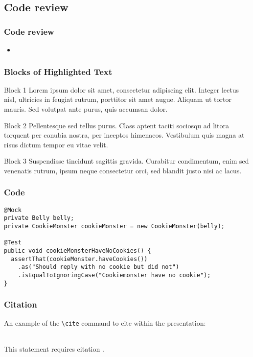 \documentclass{beamer}
\begin{document}
  \subsection{Code review}
    \begin{frame}
    \frametitle{Code review}
    \begin{itemize}
    \item
    \end{itemize}
    \end{frame}

\begin{frame}
\frametitle{Blocks of Highlighted Text}
\begin{block}{Block 1}
Lorem ipsum dolor sit amet, consectetur adipiscing elit. Integer lectus nisl, ultricies in feugiat rutrum, porttitor sit amet augue. Aliquam ut tortor mauris. Sed volutpat ante purus, quis accumsan dolor.
\end{block}

\begin{block}{Block 2}
Pellentesque sed tellus purus. Class aptent taciti sociosqu ad litora torquent per conubia nostra, per inceptos himenaeos. Vestibulum quis magna at risus dictum tempor eu vitae velit.
\end{block}

\begin{block}{Block 3}
Suspendisse tincidunt sagittis gravida. Curabitur condimentum, enim sed venenatis rutrum, ipsum neque consectetur orci, sed blandit justo nisi ac lacus.
\end{block}
\end{frame}

\begin{frame}[fragile]
\frametitle{Code}
\begin{example}[Code]
\begin{lstlisting}
@Mock
private Belly belly;
private CookieMonster cookieMonster = new CookieMonster(belly);

@Test
public void cookieMonsterHaveNoCookies() {
  assertThat(cookieMonster.haveCookies())
    .as("Should reply with no cookie but did not")
    .isEqualToIgnoringCase("Cookiemonster have no cookie");
}
\end{lstlisting}
\end{example}
\end{frame}

\begin{frame}[fragile] %
\frametitle{Citation}
An example of the \verb|\cite| command to cite within the presentation:\\~

This statement requires citation \cite{p1}.
\end{frame}
\end{document}
